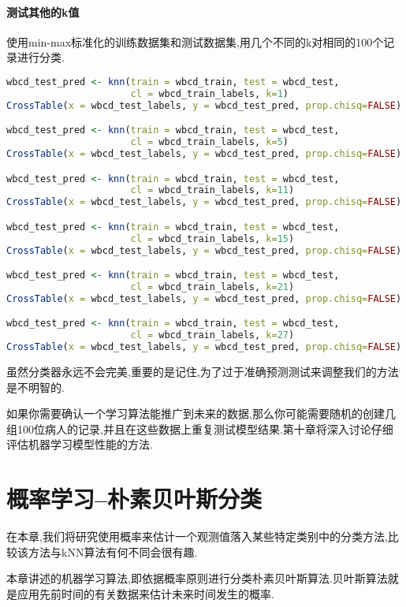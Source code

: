 \documentclass[11pt,a4paper,oneside]{book}
\begin{document}
\subsubsection{测试其他的k值}
使用min-max标准化的训练数据集和测试数据集,用几个不同的k对相同的100个记录进行分类.
\begin{lstlisting}[language=r]
wbcd_test_pred <- knn(train = wbcd_train, test = wbcd_test, 
                      cl = wbcd_train_labels, k=1)
CrossTable(x = wbcd_test_labels, y = wbcd_test_pred, prop.chisq=FALSE)

wbcd_test_pred <- knn(train = wbcd_train, test = wbcd_test, 
                      cl = wbcd_train_labels, k=5)
CrossTable(x = wbcd_test_labels, y = wbcd_test_pred, prop.chisq=FALSE)

wbcd_test_pred <- knn(train = wbcd_train, test = wbcd_test, 
                      cl = wbcd_train_labels, k=11)
CrossTable(x = wbcd_test_labels, y = wbcd_test_pred, prop.chisq=FALSE)

wbcd_test_pred <- knn(train = wbcd_train, test = wbcd_test, 
                      cl = wbcd_train_labels, k=15)
CrossTable(x = wbcd_test_labels, y = wbcd_test_pred, prop.chisq=FALSE)

wbcd_test_pred <- knn(train = wbcd_train, test = wbcd_test, 
                      cl = wbcd_train_labels, k=21)
CrossTable(x = wbcd_test_labels, y = wbcd_test_pred, prop.chisq=FALSE)

wbcd_test_pred <- knn(train = wbcd_train, test = wbcd_test, 
                      cl = wbcd_train_labels, k=27)
CrossTable(x = wbcd_test_labels, y = wbcd_test_pred, prop.chisq=FALSE)
\end{lstlisting}
虽然分类器永远不会完美,重要的是记住,为了过于准确预测测试来调整我们的方法是不明智的.
\begin{tcolorbox}[colback=pink!10!white,colframe=pink!100!black]
如果你需要确认一个学习算法能推广到未来的数据,那么你可能需要随机的创建几组100位病人的记录,并且在这些数据上重复测试模型结果.第十章将深入讨论仔细评估机器学习模型性能的方法.
\end{tcolorbox}

\chapter{概率学习--朴素贝叶斯分类}
在本章,我们将研究使用概率来估计一个观测值落入某些特定类别中的分类方法,比较该方法与kNN算法有何不同会很有趣.

本章讲述的机器学习算法,即依据概率原则进行分类朴素贝叶斯算法.贝叶斯算法就是应用先前时间的有关数据来估计未来时间发生的概率.
\end{document}
